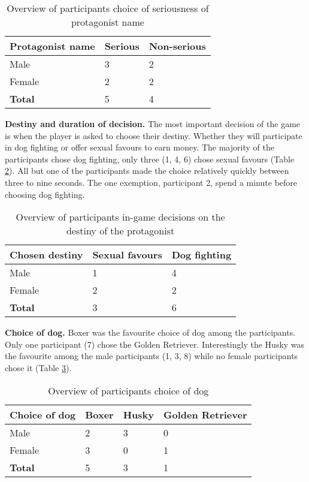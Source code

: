 \begin{table}[h]
\centering
\begin{tabular}{l l l}
\hline
\textbf{Protagonist name} & Serious & Non-serious \\
\hline
Male & 3 & 2 \\
Female & 2 & 2 \\
\textbf{Total} & 5 & 4 \\
\hline
\end{tabular}
\caption{\label{tab:name}Overview of participants choice of seriousness of protagonist name}
\end{table}


\textbf{Destiny and duration of decision.} The most important decision of the game is when the player is asked to choose their destiny. Whether they will participate in dog fighting or offer sexual favours to earn money. The majority of the participants chose dog fighting, only three (1, 4, 6) chose sexual favours (Table \ref{tab:dest}). All but one of the participants made the choice relatively quickly between three to nine seconds. The one exemption, participant 2, spend a minute before choosing dog fighting.

\begin{table}[h]
\centering
\begin{tabular}{l l l}
\hline
\textbf{Chosen destiny} & Sexual favours & Dog fighting \\
\hline
Male & 1 & 4 \\
Female & 2 & 2 \\
\textbf{Total} & 3 & 6 \\
\hline
\end{tabular}
\caption{\label{tab:dest}Overview of participants in-game decisions on the destiny of the protagonist}
\end{table}


\textbf{Choice of dog.} Boxer was the favourite choice of dog among the participants. Only one participant (7) chose the Golden Retriever. Interestingly the Husky was the favourite among the male participants (1, 3, 8) while no female participants chose it (Table \ref{tab:dog}).

\begin{table}[h]
\centering
\begin{tabular}{l l l l}
\hline
\textbf{Choice of dog} & Boxer & Husky & Golden Retriever \\
\hline
Male & 2 & 3 & 0 \\
Female & 3 & 0 & 1 \\
\textbf{Total} & 5 & 3 & 1 \\
\hline
\end{tabular}
\caption{\label{tab:dog}Overview of participants choice of dog}
\end{table}


